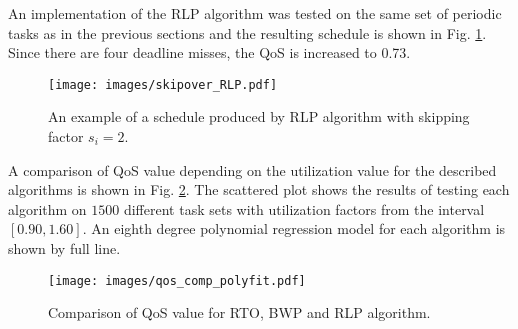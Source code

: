 An implementation of the RLP algorithm was tested on the same set of periodic tasks as in the previous sections and the resulting schedule is shown in Fig. 
\ref{rlp_schedule}.
Since there are four deadline misses, the QoS is increased to 0.73.

\begin{figure}[ht]
    \centering
    \texttt{[image: images/skipover\_RLP.pdf]}
    \caption{An example of a schedule produced by RLP algorithm with skipping factor $s_i=2$.}
    \label{rlp_schedule}
\end{figure}

A comparison of QoS value depending on the utilization value for the described algorithms is shown in Fig. \ref{fm_comparison}.
The scattered plot shows the results of testing each algorithm on $1500$ different task sets with utilization factors from the interval $[0.90, 1.60]$.
An eighth degree polynomial regression model for each algorithm is shown by full line.

\begin{figure}[ht]
    \centering
    \texttt{[image: images/qos\_comp\_polyfit.pdf]}
    \caption{Comparison of QoS value for RTO, BWP and RLP algorithm.}
    \label{fm_comparison}
\end{figure}





